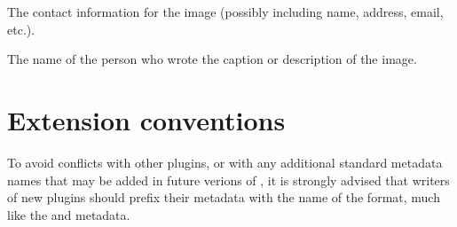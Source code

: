 
The contact information for the image (possibly including name, address,
email, etc.).
\apiend


The name of the person who wrote the caption or description of the image.
\apiend


\section{Extension conventions}

To avoid conflicts with other plugins, or with any additional standard
metadata names that may be added in future verions of \product, it is
strongly advised that writers of new plugins should prefix their
metadata with the name of the format, much like the 
and  metadata.


\chapwidthend
